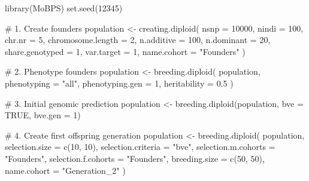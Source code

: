 \documentclass[
  letterpaper,
]{book}
\newenvironment{Shaded}{\begin{snugshade}}{\end{snugshade}}
\newcommand{\AttributeTok}[1]{\textcolor[rgb]{0.40,0.45,0.13}{#1}}
\newcommand{\CommentTok}[1]{\textcolor[rgb]{0.37,0.37,0.37}{#1}}
\newcommand{\ConstantTok}[1]{\textcolor[rgb]{0.56,0.35,0.01}{#1}}
\newcommand{\DecValTok}[1]{\textcolor[rgb]{0.68,0.00,0.00}{#1}}
\newcommand{\FloatTok}[1]{\textcolor[rgb]{0.68,0.00,0.00}{#1}}
\newcommand{\FunctionTok}[1]{\textcolor[rgb]{0.28,0.35,0.67}{#1}}
\newcommand{\NormalTok}[1]{\textcolor[rgb]{0.00,0.23,0.31}{#1}}
\newcommand{\OtherTok}[1]{\textcolor[rgb]{0.00,0.23,0.31}{#1}}
\newcommand{\StringTok}[1]{\textcolor[rgb]{0.13,0.47,0.30}{#1}}
\begin{document}
\begin{Shaded}
\begin{Highlighting}[]
\FunctionTok{library}\NormalTok{(MoBPS)}
\FunctionTok{set.seed}\NormalTok{(}\DecValTok{12345}\NormalTok{)}

\CommentTok{\# 1. Create founders}
\NormalTok{population }\OtherTok{\textless{}{-}} \FunctionTok{creating.diploid}\NormalTok{(}
  \AttributeTok{nsnp =} \DecValTok{10000}\NormalTok{, }\AttributeTok{nindi =} \DecValTok{100}\NormalTok{, }\AttributeTok{chr.nr =} \DecValTok{5}\NormalTok{, }\AttributeTok{chromosome.length =} \DecValTok{2}\NormalTok{,}
  \AttributeTok{n.additive =} \DecValTok{100}\NormalTok{, }\AttributeTok{n.dominant =} \DecValTok{20}\NormalTok{, }\AttributeTok{share.genotyped =} \DecValTok{1}\NormalTok{,}
  \AttributeTok{var.target =} \DecValTok{1}\NormalTok{, }\AttributeTok{name.cohort =} \StringTok{"Founders"}
\NormalTok{)}

\CommentTok{\# 2. Phenotype founders}
\NormalTok{population }\OtherTok{\textless{}{-}} \FunctionTok{breeding.diploid}\NormalTok{(}
\NormalTok{  population, }\AttributeTok{phenotyping =} \StringTok{"all"}\NormalTok{, }\AttributeTok{phenotyping.gen =} \DecValTok{1}\NormalTok{, }\AttributeTok{heritability =} \FloatTok{0.5}
\NormalTok{)}

\CommentTok{\# 3. Initial genomic prediction}
\NormalTok{population }\OtherTok{\textless{}{-}} \FunctionTok{breeding.diploid}\NormalTok{(population, }\AttributeTok{bve =} \ConstantTok{TRUE}\NormalTok{, }\AttributeTok{bve.gen =} \DecValTok{1}\NormalTok{)}

\CommentTok{\# 4. Create first offspring generation}
\NormalTok{population }\OtherTok{\textless{}{-}} \FunctionTok{breeding.diploid}\NormalTok{(}
\NormalTok{  population, }\AttributeTok{selection.size =} \FunctionTok{c}\NormalTok{(}\DecValTok{10}\NormalTok{, }\DecValTok{10}\NormalTok{), }\AttributeTok{selection.criteria =} \StringTok{"bve"}\NormalTok{,}
  \AttributeTok{selection.m.cohorts =} \StringTok{"Founders"}\NormalTok{, }\AttributeTok{selection.f.cohorts =} \StringTok{"Founders"}\NormalTok{,}
  \AttributeTok{breeding.size =} \FunctionTok{c}\NormalTok{(}\DecValTok{50}\NormalTok{, }\DecValTok{50}\NormalTok{), }\AttributeTok{name.cohort =} \StringTok{"Generation\_2"}
\NormalTok{)}


\end{Highlighting}
\end{Shaded}
\end{document}
